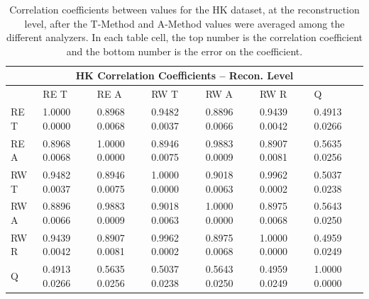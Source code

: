 \begin{table}[b]
\setlength\tabcolsep{15pt}
\footnotesize
\centering
\renewcommand{\arraystretch}{1.4}
\begin{tabularx}{0.8\linewidth}{@{\extracolsep{\fill}}lXXXXXX}
  \toprule
  	\multicolumn{7}{c}{{\normalsize HK Correlation Coefficients -- Recon. Level}} \\
  \midrule
  	       & RE T & RE A & RW T & RW A & RW R & \quad Q \\
  \midrule
	RE T   & 1.0000 0.0000 & 0.8968 0.0068 & 0.9482 0.0037 & 0.8896 0.0066 & 0.9439 0.0042 & 0.4913 0.0266  \\
	RE A   & 0.8968 0.0068 & 1.0000 0.0000 & 0.8946 0.0075 & 0.9883 0.0009 & 0.8907 0.0081 & 0.5635 0.0256  \\
	RW T   & 0.9482 0.0037 & 0.8946 0.0075 & 1.0000 0.0000 & 0.9018 0.0063 & 0.9962 0.0002 & 0.5037 0.0238  \\
	RW A   & 0.8896 0.0066 & 0.9883 0.0009 & 0.9018 0.0063 & 1.0000 0.0000 & 0.8975 0.0068 & 0.5643 0.0250  \\
	RW R   & 0.9439 0.0042 & 0.8907 0.0081 & 0.9962 0.0002 & 0.8975 0.0068 & 1.0000 0.0000 & 0.4959 0.0249  \\
	Q      & 0.4913 0.0266 & 0.5635 0.0256 & 0.5037 0.0238 & 0.5643 0.0250 & 0.4959 0.0249 & 1.0000 0.0000  \\
  \bottomrule
\end{tabularx}
\caption[]{Correlation coefficients between \R values for the HK dataset, at the reconstruction level, after the \RW T-Method and A-Method \R values were averaged among the different analyzers. In each table cell, the top number is the correlation coefficient and the bottom number is the error on the coefficient.}
\label{tab:Corrs_HK_recon}
\end{table}


